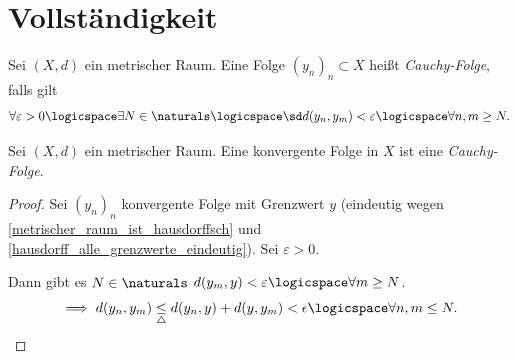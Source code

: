 \section*{Vollständigkeit}
\begin{definition}
    Sei \( (X,d) \) ein metrischer Raum. Eine Folge \( (y_n)_n \subset X\) heißt \emph{Cauchy-Folge}, falls gilt
    \begin{align*}
        \forall \varepsilon>0 \logicspace \exists N\in \naturals \logicspace \sd d(y_n, y_m)<\varepsilon \logicspace \forall n,m\geq N.
    \end{align*} 
\end{definition}
\begin{lemma}
    Sei \( (X,d) \)  ein metrischer Raum. Eine konvergente Folge in \( X \)  ist eine \emph{Cauchy-Folge}.
\end{lemma}
\begin{proof}
    Sei \( (y_n)_n \)  konvergente Folge mit Grenzwert \( y \) (eindeutig wegen \ref{metrischer_raum_ist_hausdorffsch} und \ref{hausdorff_alle_grenzwerte_eindeutig}). Sei \( \varepsilon>0 \).

    Dann gibt es \( N\in \naturals  \) \sd \( d(y_m, y)<\varepsilon \logicspace  \forall m\geq N\).
    \begin{align*}
        \implies d(y_n,y_m)\underset{\triangle}{\leq}d(y_n,y)+d(y,y_m)<\epsilon \logicspace \forall n,m\leq N.
    \end{align*}   
\end{proof}
